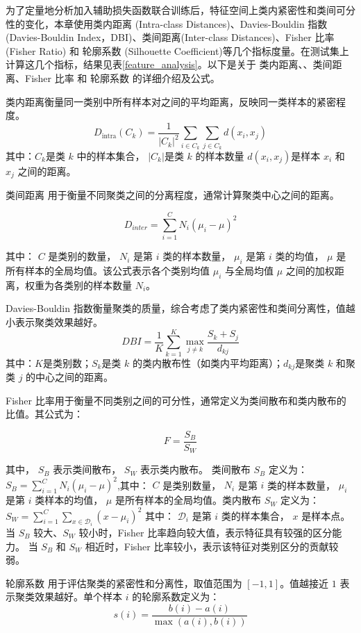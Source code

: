为了定量地分析加入辅助损失函数联合训练后，特征空间上类内紧密性和类间可分性的变化，本章使用类内距离 (Intra-class Distances)、Davies-Bouldin 指数 (Davies-Bouldin Index，DBI)\cite{davies1979cluster}、类间距离(Inter-class Distances)、Fisher 比率 (Fisher Ratio) 和 轮廓系数 (Silhouette Coefficient)\cite{rousseeuw1987silhouettes}等几个指标度量。在测试集上计算这几个指标，结果见表\ref{feature_analysis}。以下是关于 类内距离、、类间距离、Fisher 比率  和 轮廓系数 的详细介绍及公式。

类内距离衡量同一类别中所有样本对之间的平均距离，反映同一类样本的紧密程度。
\[
D_{\text{intra}}(C_k) = \frac{1}{|C_k|^2} \sum_{i \in C_k} \sum_{j \in C_k} d(x_i, x_j)
\]
其中：$C_k$是类 $k$ 中的样本集合， $|C_k|$是类 $k$ 的样本数量 $d(x_i, x_j)$是样本 $x_i$ 和 $x_j$ 之间的距离。

类间距离 用于衡量不同聚类之间的分离程度，通常计算聚类中心之间的距离。

\[
D_{inter} = \sum_{i=1}^{C} N_i (\mu_i - \mu)^2
\]

其中：  \( C \) 是类别的数量，   \( N_i \) 是第 \( i \) 类的样本数量，  \( \mu_i \) 是第 \( i \) 类的均值， \( \mu \) 是所有样本的全局均值。该公式表示各个类别均值 \( \mu_i \) 与全局均值 \( \mu \) 之间的加权距离，权重为各类别的样本数量 \( N_i \)。

Davies-Bouldin 指数衡量聚类的质量，综合考虑了类内紧密性和类间分离性，值越小表示聚类效果越好。
\[
DBI = \frac{1}{K} \sum_{k=1}^K \max_{j \neq k} \frac{S_k + S_j}{d_{kj}}
\]
其中：$K$是类别数；$S_k$是类 $k$ 的类内散布性（如类内平均距离）；$d_{kj}$是聚类 $k$ 和聚类 $j$ 的中心之间的距离。


Fisher 比率用于衡量不同类别之间的可分性，通常定义为类间散布和类内散布的比值。其公式为：

\[
F = \frac{S_B}{S_W}
\]

其中， \( S_B \) 表示类间散布，  \( S_W \) 表示类内散布。
类间散布 \( S_B \) 定义为：$S_B = \sum_{i=1}^C N_i (\mu_i - \mu)^2$,其中：  \( C \) 是类别数量，   \( N_i \) 是第 \( i \) 类的样本数量，   \( \mu_i \) 是第 \( i \) 类样本的均值，  \( \mu \) 是所有样本的全局均值。类内散布 \( S_W \) 定义为：$S_W = \sum_{i=1}^C \sum_{x \in \mathcal{D}_i} (x - \mu_i)^2 $
其中：  \( \mathcal{D}_i \) 是第 \( i \) 类的样本集合，  \( x \) 是样本点。当 \( S_B \) 较大、\( S_W \) 较小时，Fisher 比率趋向较大值，表示特征具有较强的区分能力。  当 \( S_B \) 和 \( S_W \) 相近时，Fisher 比率较小，表示该特征对类别区分的贡献较弱。


轮廓系数 用于评估聚类的紧密性和分离性，取值范围为 $[-1, 1]$。值越接近 $1$ 表示聚类效果越好。单个样本 $i$ 的轮廓系数定义为：
\[
s(i) = \frac{b(i) - a(i)}{\max(a(i), b(i))}
\]

